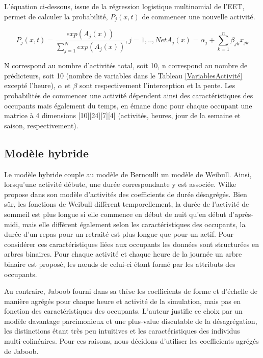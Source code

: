 L'équation ci-dessous, issue de la régression logistique multinomial de l'EET, permet de calculer la probabilité, $P_{j}(x,t)$ de commencer une nouvelle activité.

\begin{equation}
P_{j}(x,t)=\frac{exp(A_{j}(x))}{\sum\limits_{j=1}^{N}exp(A_{j}(x))}, j = 1, .., N et A_{j}(x)= \alpha_{j}+\sum\limits_{k=1}^{n}\beta_{jk}x_{jk}
\end{equation}

N correspond au nombre d'activités total, soit 10, n correspond au nombre de prédicteurs, soit 10 (nombre de variables dans le Tableau \ref{VariablesActivité} excepté l'heure), $\alpha$ et $\beta$ sont respectivement l'interception et la pente. Les probabilités de commencer une activité dépendent ainsi des caractéristiques des occupants mais également du temps, en émane donc pour chaque occupant une matrice à 4 dimensions [10][24][7][4] (activités, heures, jour de la semaine et saison, respectivement).

\subsection{Modèle hybride}

Le modèle hybride couple au modèle de Bernoulli un modèle de Weibull. Ainsi, lorsqu'une activité débute, une durée correspondante y est associée. Wilke propose dans son modèle d'activités des coefficients de durée désagrégés. Bien sûr, les fonctions de Weibull diffèrent temporellement, la durée de l'activité de sommeil est plus longue si elle commence en début de nuit qu'en début d'après-midi, mais elle diffèrent également selon les caractéristiques des occupants, la durée d'un repas pour un retraité est plus longue que pour un actif. Pour considérer ces caractéristiques liées aux occupants les données sont structurées en arbres binaires. Pour chaque activité et chaque heure de la journée un arbre binaire est proposé, les nœuds de celui-ci étant formé par les attributs des occupants.

Au contraire, Jaboob \cite{Jaboob-16} fourni dans sa thèse les coefficients de forme et d'échelle de manière agrégés pour chaque heure et activité de la simulation, mais pas en fonction des caractéristiques des occupants. L'auteur justifie ce choix par un modèle davantage parcimonieux et une plus-value discutable de la désagrégation, les distinctions étant très peu intuitives et les caractéristiques des individus  multi-colinéaires. Pour ces raisons, nous décidons d'utiliser les coefficients agrégés de Jaboob.

